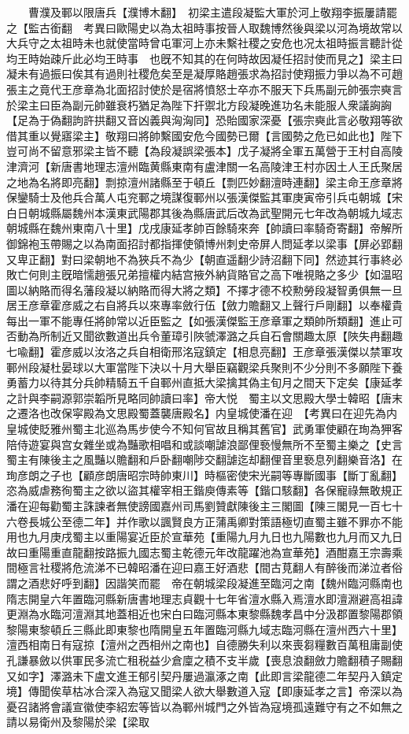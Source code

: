 　　曹濮及鄆以限唐兵【濮博木翻】　初梁主遣段凝監大軍於河上敬翔李振屢請罷之【監古銜翻　考異曰歐陽史以為太祖時事按晉人取魏博然後與梁以河為境故常以大兵守之太祖時未也就使當時曾屯軍河上亦未繫社稷之安危也况太祖時振言聽計從均王時始疎斤此必均王時事　也旣不知其的在何時故因凝任招討使而見之】梁主曰凝未有過振曰俟其有過則社稷危矣至是凝厚賂趙張求為招討使翔振力爭以為不可趙張主之竟代王彦章為北面招討使於是宿將憤怒士卒亦不服天下兵馬副元帥張宗奭言於梁主曰臣為副元帥雖衰朽猶足為陛下扞禦北方段凝晚進功名未能服人衆議詾詾【足為于偽翻訽許拱翻又音凶義與洶洶同】恐貽國家深憂【張宗奭此言必敬翔等欲借其重以覺寤梁主】敬翔曰將帥繫國安危今國勢已爾【言國勢之危已如此也】陛下豈可尚不留意邪梁主皆不聽【為段凝誤梁張本】戊子凝將全軍五萬營于王村自高陵津濟河【新唐書地理志澶州臨黄縣東南有盧津關一名高陵津王村亦因土人王氏聚居之地為名將即亮翻】剽掠澶州諸縣至于頓丘【剽匹妙翻澶時連翻】梁主命王彦章將保鑾騎士及他兵合萬人屯兖鄆之境謀復鄆州以張漢傑監其軍庚寅帝引兵屯朝城【宋白日朝城縣屬魏州本漢東武陽郡其後為縣唐武后改為武聖開元七年改為朝城九域志朝城縣在魏州東南八十里】戊戌康延孝帥百餘騎來奔【帥讀曰率騎奇寄翻】帝解所御錦袍玉帶賜之以為南面招討都指揮使領博州刺史帝屏人問延孝以梁事【屏必郢翻又卑正翻】對曰梁朝地不為狹兵不為少【朝直遥翻少詩沼翻下同】然迹其行事終必敗亡何則主旣暗懦趙張兄弟擅權内結宫掖外納貨賂官之高下唯視賂之多少【如温昭圖以納賂而得名藩段凝以納賂而得大將之類】不擇才德不校勲勞段凝智勇俱無一旦居王彦章霍彦威之右自將兵以來專率斂行伍【斂力贍翻又上聲行戶剛翻】以奉權貴每出一軍不能專任將帥常以近臣監之【如張漢傑監王彦章軍之類帥所類翻】進止可否動為所制近又聞欲數道出兵令董璋引陜虢澤潞之兵自石會關趣太原【陜失冉翻趣七喩翻】霍彦威以汝洛之兵自相衛邢洺寇鎮定【相息亮翻】王彦章張漢傑以禁軍攻鄆州段凝杜晏球以大軍當陛下決以十月大舉臣竊觀梁兵聚則不少分則不多願陛下養勇蓄力以待其分兵帥精騎五千自鄆州直抵大梁擒其偽主旬月之間天下定矣【康延孝之計與李嗣源郭崇韜所見略同帥讀曰率】帝大悦　蜀主以文思殿大學士韓昭【唐末之遷洛也改保寜殿為文思殿蜀蓋襲唐殿名】内皇城使潘在迎　【考異曰在迎先為内皇城使貶雅州蜀主北巡為馬步使今不知何官故且稱其舊官】武勇軍使顧在珣為狎客陪侍遊宴與宫女雜坐或為豔歌相唱和或談嘲謔浪鄙俚䙝慢無所不至蜀主樂之【史言蜀主有陳後主之風豔以贍翻和戶卧翻嘲陟交翻謔迄却翻俚音里䙝息列翻樂音洛】在珣彦朗之子也【顧彦朗唐昭宗時帥東川】時樞密使宋光嗣等專斷國事【斷丁亂翻】恣為威虐務徇蜀主之欲以盜其權宰相王鍇庾傳素等【鍇口駭翻】各保寵祿無敢規正潘在迎每勸蜀主誅諫者無使謗國嘉州司馬劉贊獻陳後主三閣圖【陳三閣見一百七十六卷長城公至德二年】并作歌以諷賢良方正蒲禹卿對策語極切直蜀主雖不罪亦不能用也九月庚戌蜀主以重陽宴近臣於宣華苑【重陽九月九日也九陽數也九月而又九日故曰重陽重直龍翻按路振九國志蜀主乾德元年改龍躍池為宣華苑】酒酣嘉王宗壽乘間極言社稷將危流涕不已韓昭潘在迎曰嘉王好酒悲【間古莧翻人有醉後而涕泣者俗謂之酒悲好呼到翻】因諧笑而罷　帝在朝城梁段凝進至臨河之南【魏州臨河縣南也隋志開皇六年置臨河縣新唐書地理志貞觀十七年省澶水縣入焉澶水即澶淵避高祖諱更淵為水臨河澶淵其地蓋相近也宋白曰臨河縣本東黎縣魏孝昌中分汲郡置黎陽郡領黎陽東黎頓丘三縣此即東黎也隋開皇五年置臨河縣九域志臨河縣在澶州西六十里】澶西相南日有寇掠【澶州之西相州之南也】自德勝失利以來喪芻糧數百萬租庸副使孔謙暴斂以供軍民多流亡租税益少倉廩之積不支半歲【喪息浪翻斂力贍翻積子賜翻又如字】澤潞未下盧文進王郁引契丹屢過瀛涿之南【此即言梁龍德二年契丹入鎮定境】傳聞俟草枯冰合深入為寇又聞梁人欲大舉數道入寇【即康延孝之言】帝深以為憂召諸將會議宣徽使李紹宏等皆以為鄆州城門之外皆為寇境孤遠難守有之不如無之請以易衛州及黎陽於梁【梁取